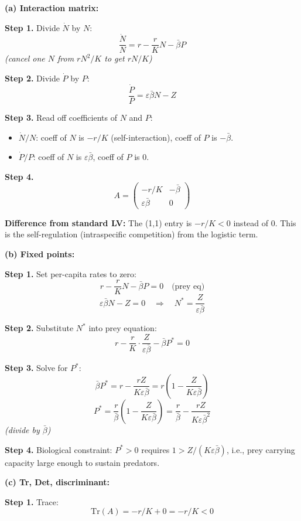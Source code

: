 \documentclass[10pt]{article}
\newcommand{\thus}{\quad\Longrightarrow\quad}
\newcommand{\stepwhy}[1]{\textcolor{blue!60!black}{\small\textit{(#1)}}}
\begin{document}
\begin{solution}
\textbf{(a) Interaction matrix:}

\textbf{Step 1.} Divide $\dot N$ by $N$:
\[
\frac{\dot N}{N} = r - \frac{r}{K}N - \bar\beta P
\]
\stepwhy{cancel one $N$ from $rN^2/K$ to get $rN/K$}

\textbf{Step 2.} Divide $\dot P$ by $P$:
\[
\frac{\dot P}{P} = \varepsilon\bar\beta N - Z
\]

\textbf{Step 3.} Read off coefficients of $N$ and $P$:
\begin{itemize}
\item $\dot N/N$: coeff of $N$ is $-r/K$ (self-interaction), coeff of $P$ is $-\bar\beta$.
\item $\dot P/P$: coeff of $N$ is $\varepsilon\bar\beta$, coeff of $P$ is 0.
\end{itemize}

\textbf{Step 4.}
\[
A = \begin{pmatrix} -r/K & -\bar\beta \\ \varepsilon\bar\beta & 0 \end{pmatrix}
\]

\textbf{Difference from standard LV:} The (1,1) entry is $-r/K < 0$ instead of 0. This is the self-regulation (intraspecific competition) from the logistic term.

\medskip\textbf{(b) Fixed points:}

\textbf{Step 1.} Set per-capita rates to zero:
\[
r - \frac{r}{K}N - \bar\beta P = 0 \quad\text{(prey eq)}
\]
\[
\varepsilon\bar\beta N - Z = 0 \thus N^* = \frac{Z}{\varepsilon\bar\beta}
\]

\textbf{Step 2.} Substitute $N^*$ into prey equation:
\[
r - \frac{r}{K}\cdot\frac{Z}{\varepsilon\bar\beta} - \bar\beta P^* = 0
\]

\textbf{Step 3.} Solve for $P^*$:
\[
\bar\beta P^* = r - \frac{rZ}{K\varepsilon\bar\beta} = r\left(1 - \frac{Z}{K\varepsilon\bar\beta}\right)
\]
\[
P^* = \frac{r}{\bar\beta}\left(1 - \frac{Z}{K\varepsilon\bar\beta}\right) = \frac{r}{\bar\beta} - \frac{rZ}{K\varepsilon\bar\beta^2}
\]
\stepwhy{divide by $\bar\beta$}

\textbf{Step 4.} Biological constraint: $P^* > 0$ requires $1 > Z/(K\varepsilon\bar\beta)$, i.e., prey carrying capacity large enough to sustain predators.

\medskip\textbf{(c) Tr, Det, discriminant:}

\textbf{Step 1.} Trace:
\[
\text{Tr}(A) = -r/K + 0 = -r/K < 0
\]


\end{solution}
\end{document}
